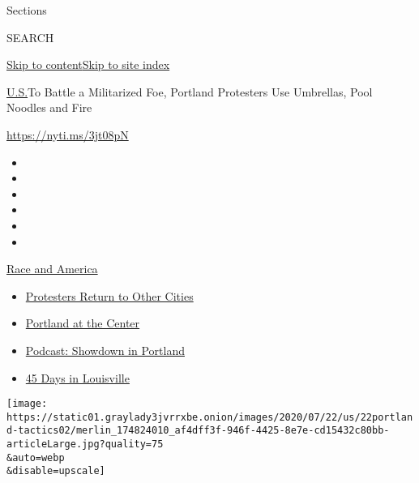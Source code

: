 Sections

SEARCH

\protect\hyperlink{site-content}{Skip to
content}\protect\hyperlink{site-index}{Skip to site index}

\href{/section/us}{U.S.}\textbar{}To Battle a Militarized Foe, Portland
Protesters Use Umbrellas, Pool Noodles and Fire

\url{https://nyti.ms/3jt08pN}

\begin{itemize}
\item
\item
\item
\item
\item
\item
\end{itemize}

\href{https://www.nytimes3xbfgragh.onion/news-event/george-floyd-protests-minneapolis-new-york-los-angeles?action=click\&pgtype=Article\&state=default\&region=TOP_BANNER\&context=storylines_menu}{Race
and America}

\begin{itemize}
\tightlist
\item
  \href{https://www.nytimes3xbfgragh.onion/2020/07/26/us/protests-portland-seattle-trump.html?action=click\&pgtype=Article\&state=default\&region=TOP_BANNER\&context=storylines_menu}{Protesters
  Return to Other Cities}
\item
  \href{https://www.nytimes3xbfgragh.onion/2020/07/24/us/portland-oregon-protests-white-race.html?action=click\&pgtype=Article\&state=default\&region=TOP_BANNER\&context=storylines_menu}{Portland
  at the Center}
\item
  \href{https://www.nytimes3xbfgragh.onion/2020/07/23/podcasts/the-daily/portland-protests.html?action=click\&pgtype=Article\&state=default\&region=TOP_BANNER\&context=storylines_menu}{Podcast:
  Showdown in Portland}
\item
  \href{https://www.nytimes3xbfgragh.onion/interactive/2020/07/16/us/black-lives-matter-protests-louisville-breonna-taylor.html?action=click\&pgtype=Article\&state=default\&region=TOP_BANNER\&context=storylines_menu}{45
  Days in Louisville}
\end{itemize}

\texttt{[image: https://static01.graylady3jvrrxbe.onion/images/2020/07/22/us/22portland-tactics02/merlin\_174824010\_af4dff3f-946f-4425-8e7e-cd15432c80bb-articleLarge.jpg?quality=75\\\&auto=webp\\\&disable=upscale]}

